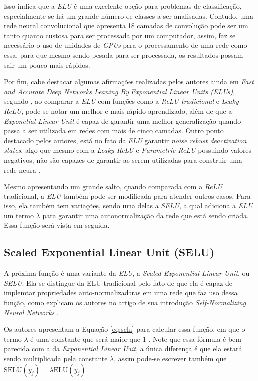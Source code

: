 Isso indica que a \textit{ELU} é uma excelente opção para problemas de classificação, especialmente se há um grande número de classes a ser analisadas. Contudo, uma rede neural convolucional que apresenta 18 camadas de convolução pode ser um tanto quanto custosa para ser processada por um computador, assim, faz se necessário o uso de unidades de \textit{GPUs} para o processamento de uma rede como essa, para que mesmo sendo pesada para ser processada, os resultados possam sair um pouco mais rápidos.

Por fim, cabe destacar algumas afirmações realizadas pelos autores ainda em \textit{Fast and Accurate Deep Networks Leaning By Exponential Linear Units (ELUs)}, segundo \textcite{ELUArticle}, ao comparar a \textit{ELU} com funções como a \textit{ReLU tradicional} e \textit{Leaky ReLU}, pode-se notar um melhor e mais rápido aprendizado, além de que a \textit{Exponetial Linear Unit} é capaz de garantir uma melhor generalização quando passa a ser utilizada em redes com mais de cinco camadas. Outro ponto destacado pelos autores, está no fato da \textit{ELU} garantir \textit{noise rebust deactivation states}, algo que mesmo com a \textit{Leaky ReLU} e \textit{Parametric ReLU} possuindo valores negativos, não são capazes de garantir ao serem utilizadas para construir uma rede neura \parencite{ELUArticle}.

Mesmo apresentando um grande salto, quando comparada com a \textit{ReLU} tradicional, a \textit{ELU} também pode ser modificada para atender outros casos. Para isso, ela também tem variações, sendo uma delas a \textit{SELU}, a qual adiciona a \textit{ELU} um termo $\lambda$ para garantir uma autonormalização da rede que está sendo criada. Essa função será vista em seguida.

\subsection{Scaled Exponential Linear Unit (SELU)}

A próxima função é uma variante da \textit{ELU}, a \textit{Scaled Exponential Linear Unit}, ou \textit{SELU}. Ela se distingue da ELU tradicional pelo fato de que ela é capaz de implemtar propriedades auto-normalizadoras em uma rede que faz uso dessa função, como explicam os autores no artigo de sua introdução \textit{Self-Normalizing Neural Networks} \parencite{SELUArticle}.

Os autores apresentam a Equação \ref{eq:selu} para calcular essa função, em que o termo $\lambda$ é uma constante que será maior que 1 \parencite{SELUArticle}. Note que essa fórmula é bem parecida com a da \textit{Exponential Linear Unit}, a única diferença é que ela estará sendo multiplicada pela constante $\lambda$, assim pode-se escrever também que $\text{SELU}(y_j) = \lambda \text{ELU}(y_j)$.

